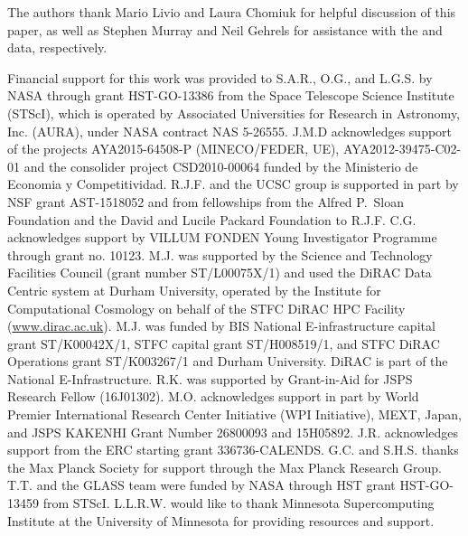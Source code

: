 
\begin{acknowledgments}
The authors thank Mario Livio and Laura Chomiuk for helpful discussion
of this paper, as well as Stephen Murray and Neil Gehrels for
assistance with the \Chandra and \SWIFT data, respectively.

Financial support for this work was provided to S.A.R., O.G., and L.G.S. by NASA
through grant HST-GO-13386 from the Space Telescope Science Institute
(STScI), which is operated by Associated Universities for Research in
Astronomy, Inc. (AURA), under NASA contract NAS 5-26555.
J.M.D acknowledges support of the
projects AYA2015-64508-P (MINECO/FEDER, UE), AYA2012-39475-C02-01 and
the consolider project CSD2010-00064 funded by the Ministerio de
Economia y Competitividad.
R.J.F. and the UCSC group is supported in part by NSF grant
AST-1518052 and from fellowships from the Alfred P.\ Sloan Foundation
and the David and Lucile Packard Foundation to R.J.F.
C.G. acknowledges support by VILLUM FONDEN Young Investigator Programme through grant no. 10123.
M.J. was supported by the Science and
Technology Facilities Council (grant number ST/L00075X/1) and used the
DiRAC Data Centric system at Durham University, operated by the
Institute for Computational Cosmology on behalf of the STFC DiRAC HPC
Facility (\url{www.dirac.ac.uk}).  M.J. was funded by BIS National
E-infrastructure capital grant ST/K00042X/1, STFC capital grant
ST/H008519/1, and STFC DiRAC Operations grant ST/K003267/1 and Durham
University. DiRAC is part of the National E-Infrastructure.
R.K. was supported by Grant-in-Aid for JSPS Research Fellow (16J01302).
M.O.  acknowledges support in part by World Premier International
Research Center Initiative (WPI Initiative), MEXT, Japan, and JSPS
KAKENHI Grant Number 26800093 and 15H05892.
J.R. acknowledges support from the ERC starting grant
336736-CALENDS.
G.C. and S.H.S. thanks the Max Planck Society for support through the Max Planck
Research Group.
T.T. and the GLASS team were funded by NASA through HST grant
HST-GO-13459 from STScI.
L.L.R.W. would like to thank Minnesota Supercomputing Institute at
the University of Minnesota for providing resources and support.


\end{acknowledgments}
